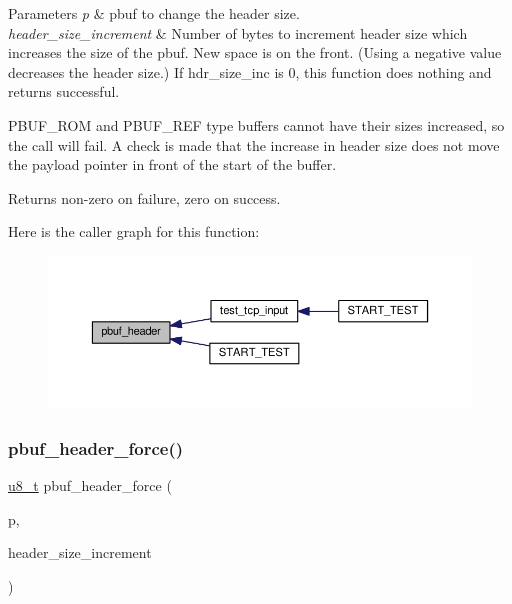 \begin{DoxyParams}{Parameters}
{\em p} & pbuf to change the header size. \\
\hline
{\em header\+\_\+size\+\_\+increment} & Number of bytes to increment header size which increases the size of the pbuf. New space is on the front. (Using a negative value decreases the header size.) If hdr\+\_\+size\+\_\+inc is 0, this function does nothing and returns successful.\\
\hline
\end{DoxyParams}
P\+B\+U\+F\+\_\+\+R\+OM and P\+B\+U\+F\+\_\+\+R\+EF type buffers cannot have their sizes increased, so the call will fail. A check is made that the increase in header size does not move the payload pointer in front of the start of the buffer. \begin{DoxyReturn}{Returns}
non-\/zero on failure, zero on success. 
\end{DoxyReturn}
Here is the caller graph for this function\+:
\nopagebreak
\begin{figure}[H]
\begin{center}
\leavevmode
\includegraphics[width=350pt]{openmote-cc2538_2lwip_2src_2include_2lwip_2pbuf_8h_aaa17c1951cf2d207b6adfd3947d91f00_icgraph}
\end{center}
\end{figure}
\mbox{\label{openmote-cc2538_2lwip_2src_2include_2lwip_2pbuf_8h_a27480c41c34021d4417691d327163626}} 
\subsubsection{\texorpdfstring{pbuf\+\_\+header\+\_\+force()}{pbuf\_header\_force()}}
{\footnotesize\ttfamily \hyperlink{group__compiler__abstraction_ga4caecabca98b43919dd11be1c0d4cd8e}{u8\+\_\+t} pbuf\+\_\+header\+\_\+force (\begin{DoxyParamCaption}\item[{struct \hyperlink{structpbuf}{pbuf} $\ast$}]{p,  }\item[{\hyperlink{group__compiler__abstraction_gacf46f4df0ebab84edebcb69967fdf86b}{s16\+\_\+t}}]{header\+\_\+size\+\_\+increment }\end{DoxyParamCaption})}

